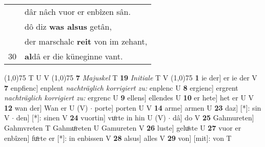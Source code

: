 \documentclass[8pt,a4paper,notitlepage]{article}
\begin{document}
\begin{table}[ht]
\begin{minipage}[t]{0.5\linewidth}
\begin{tabular}{rl}
 & dâr nâch vuor er enbîzen sân.\\ 
 & dô diz \textbf{was alsus} getân,\\ 
 & der marschalc \textbf{reit} von im zehant,\\ 
30 & \textbf{al}dâ er die küneginne vant.\\ 
\end{tabular}
\scriptsize
\line(1,0){75} \newline
T U V \newline
\line(1,0){75} \newline
\textbf{7} \textit{Majuskel} T  \textbf{19} \textit{Initiale} T V  \newline
\line(1,0){75} \newline
\textbf{1} ie der] er ie der V \textbf{7} enpfienc] enplent \textit{nachträglich korrigiert zu:} enplenc U \textbf{8} ergienc] ergrent \textit{nachträglich korrigiert zu:} ergrenc U \textbf{9} ellens] ellendes U \textbf{10} er hete] het er U V \textbf{12} wan der] Wan er U (V)  $\cdot$ porte] porten U V \textbf{14} arme] armen U \textbf{23} daz] [*]: sin V  $\cdot$ den] [*]: sinen V \textbf{24} vuortin] vuͦrte in hin U (V)  $\cdot$ dâ] do V \textbf{25} Gahmureten] Gahmvreten T Gahmuͦreten U Gamureten V \textbf{26} luste] geluͦste U \textbf{27} vuor er enbîzen] fuͦrte er [*]: in enbissen V \textbf{28} alsus] alles V \textbf{29} von] [mit]: von T \newline
\end{minipage}
\end{table}
\end{document}
